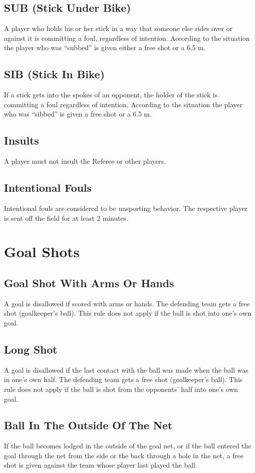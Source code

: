 \subsection{SUB (Stick Under Bike)}
A player who holds his or her stick in a way that someone else rides over or against it is committing a foul, regardless
of intention. According to the situation the player who was “subbed” is given either a free shot or a 6.5 m.
\subsection{SIB (Stick In Bike)}
If a stick gets into the spokes of an opponent, the holder of the stick is committing a foul regardless of intention.
According to the situation the player who was “sibbed” is given a free shot or a 6.5 m.
\subsection{Insults}
A player must not insult the Referee or other players.
\subsection{Intentional Fouls}
Intentional fouls are considered to be unsporting behavior. The respective player is sent off the field for at least 2
minutes.
\section{Goal Shots}
\subsection{Goal Shot With Arms Or Hands}
A goal is disallowed if scored with arms or hands. The defending team gets a free shot (goalkeeper's ball). This rule
does not apply if the ball is shot into one's own goal.
\subsection{Long Shot}
A goal is disallowed if the last contact with the ball was made when the ball was in one’s own half. The defending
team gets a free shot (goalkeeper's ball). This rule does not apply if the ball is shot from the opponents' half into one's
own goal.
\subsection{Ball In The Outside Of The Net}
If the ball becomes lodged in the outside of the goal net, or if the ball entered the goal through the net from the side or
the back through a hole in the net, a free shot is given against the team whose player last played the ball.
